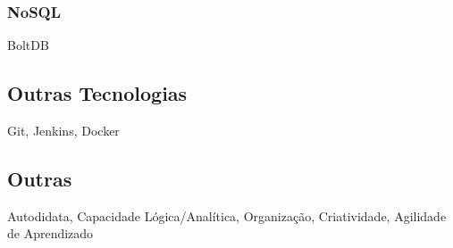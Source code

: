 \documentclass{article}
\begin{document}
\begin{multicols}{2}
\subsubsection{NoSQL}
BoltDB
\subsection{Outras Tecnologias}
Git, Jenkins, Docker
\subsection{Outras}
Autodidata, Capacidade L\'ogica/Anal\'itica, Organiza\c{c}\~ao, Criatividade, Agilidade de
Aprendizado

\end{multicols}
\end{document}
